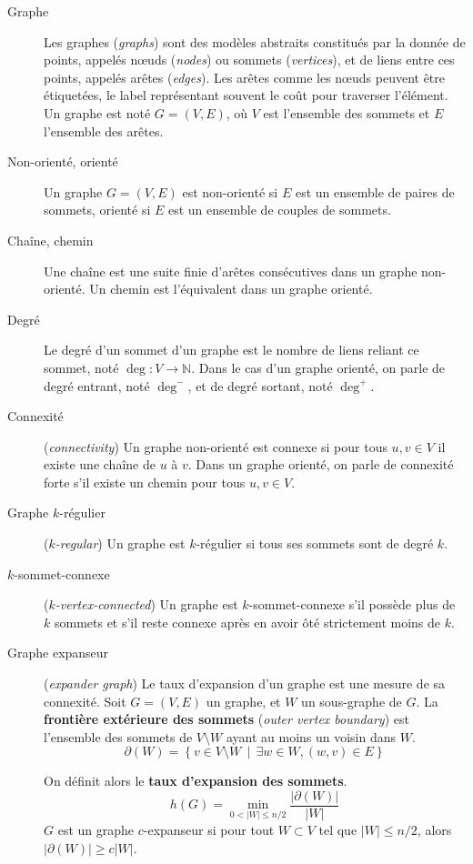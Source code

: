 \documentclass[12pt,a4paper]{article}
\begin{document}
\begin{description}
\item[Graphe] Les graphes (\textit{graphs}) sont des modèles abstraits
  constitués par la donnée de points, appelés nœuds (\textit{nodes})
  ou sommets (\textit{vertices}), et de liens entre ces points,
  appelés arêtes (\textit{edges}). Les arêtes comme les nœuds peuvent
  être étiquetées, le label représentant souvent le coût pour
  traverser l'élément. Un graphe est noté \(G = (V, E)\), où \(V\)
  est l'ensemble des sommets et \(E\) l'ensemble des arêtes.
\item[Non-orienté, orienté] Un graphe \(G = (V, E)\) est non-orienté si
  \(E\) est un ensemble de paires de sommets, orienté si \(E\) est un
  ensemble de couples de sommets.
\item[Chaîne, chemin] Une chaîne est une suite finie d'arêtes
  consécutives dans un graphe non-orienté. Un chemin est l'équivalent
  dans un graphe orienté.
\item[Degré] Le degré d'un sommet d'un graphe est le nombre de liens
  reliant ce sommet, noté \(\deg : V \to \mathbb{N}\). Dans le cas
  d'un graphe orienté, on parle de degré entrant, noté \(\deg^-\), et
  de degré sortant, noté \(\deg^+\).
\item[Connexité] (\textit{connectivity}) Un graphe non-orienté est
  connexe si pour tous \(u, v \in V\) il existe une chaîne de \(u\) à
  \(v\). Dans un graphe orienté, on parle de connexité forte s'il
  existe un chemin pour tous \(u, v \in V\).
\item[Graphe \(k\)-régulier] (\textit{\(k\)-regular}) Un graphe est
  \(k\)-régulier si tous ses sommets sont de degré \(k\).
\item[\(k\)-sommet-connexe] (\textit{\(k\)-vertex-connected}) Un
  graphe est \(k\)-sommet-connexe s'il possède plus de \(k\) sommets
  et s'il reste connexe après en avoir ôté strictement moins de \(k\).
\item[Graphe expanseur] (\textit{expander graph}) Le taux d'expansion
  d'un graphe est une mesure de sa connexité. Soit \(G = (V, E)\) un
  graphe, et \(W\) un sous-graphe de \(G\). La \textbf{frontière
    extérieure des sommets} (\textit{outer vertex boundary}) est
  l'ensemble des sommets de \(V \setminus W\) ayant au moins un voisin
  dans \(W\).
  \[\partial(W) = \left\{v \in V \setminus W \,\middle|\, \exists w
      \in W, (w, v) \in E\right\}\]

  On définit alors le \textbf{taux d'expansion des sommets}.
  \[h(G) = \min_{0 < |W| \leq n/2}\frac{|\partial(W)|}{|W|}\]
  \(G\) est un graphe \(c\)-expanseur si pour tout \(W \subset V\) tel
  que \(|W| \leq n / 2\), alors \(|\partial(W)| \geq c |W|\).
\end{description}
\end{document}
